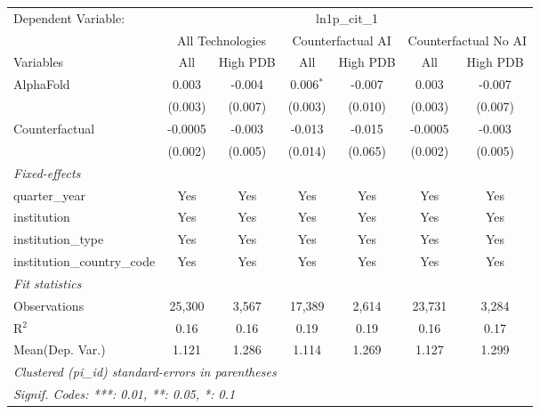 \begingroup
\centering
\begin{tabular}{lcccccc}
   \tabularnewline \midrule \midrule
   Dependent Variable: & \multicolumn{6}{c}{ln1p\_cit\_1}\\
 & \multicolumn{2}{c}{All Technologies} & \multicolumn{2}{c}{Counterfactual AI} & \multicolumn{2}{c}{Counterfactual No AI} \\
\cmidrule(lr){1-1}\cmidrule(lr){2-3} \cmidrule(lr){4-5} \cmidrule(lr){6-7}
Variables & \multicolumn{1}{c}{All} & \multicolumn{1}{c}{High PDB} & \multicolumn{1}{c}{All} & \multicolumn{1}{c}{High PDB} & \multicolumn{1}{c}{All} & \multicolumn{1}{c}{High PDB} \\
\cmidrule(lr){1-1}\cmidrule(lr){2-2} \cmidrule(lr){3-3} \cmidrule(lr){4-4} \cmidrule(lr){5-5} \cmidrule(lr){6-6} \cmidrule(lr){7-7}
   AlphaFold                    & 0.003   & -0.004  & 0.006$^{*}$ & -0.007  & 0.003   & -0.007\\   
                                & (0.003) & (0.007) & (0.003)     & (0.010) & (0.003) & (0.007)\\   
   Counterfactual               & -0.0005 & -0.003  & -0.013      & -0.015  & -0.0005 & -0.003\\   
                                & (0.002) & (0.005) & (0.014)     & (0.065) & (0.002) & (0.005)\\   
   \midrule
   \emph{Fixed-effects}\\
   quarter\_year                & Yes     & Yes     & Yes         & Yes     & Yes     & Yes\\  
   institution                  & Yes     & Yes     & Yes         & Yes     & Yes     & Yes\\  
   institution\_type            & Yes     & Yes     & Yes         & Yes     & Yes     & Yes\\  
   institution\_country\_code   & Yes     & Yes     & Yes         & Yes     & Yes     & Yes\\  
   \midrule
   \emph{Fit statistics}\\
   Observations                 & 25,300  & 3,567   & 17,389      & 2,614   & 23,731  & 3,284\\  
   R$^2$                        & 0.16    & 0.16    & 0.19        & 0.19    & 0.16    & 0.17\\  
Mean(Dep. Var.) & 1.121 & 1.286 & 1.114 & 1.269 & 1.127 & 1.299 \\
   \midrule \midrule
   \multicolumn{7}{l}{\emph{Clustered (pi\_id) standard-errors in parentheses}}\\
   \multicolumn{7}{l}{\emph{Signif. Codes: ***: 0.01, **: 0.05, *: 0.1}}\\
\end{tabular}
\par\endgroup
